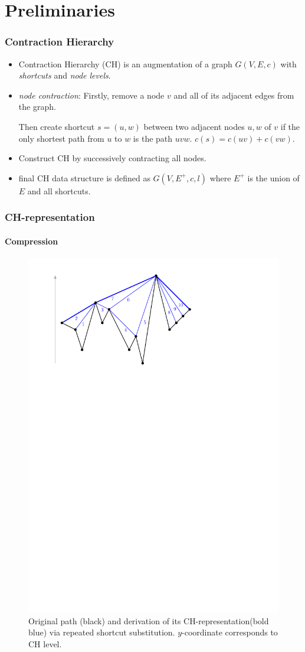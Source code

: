 \documentclass{beamer}
\newcommand{\chrep}{CH-representation\xspace}
\begin{document}
\section{Preliminaries}
\begin{frame}
	\frametitle{Contraction Hierarchy}
	\begin{itemize}
		\item Contraction Hierarchy (CH) is an augmentation of a graph $G(V,E,c)$ with \emph{shortcuts} and \emph{node levels}. \pause
		\item \emph{node contraction}: Firstly, remove a node $v$ and all of its adjacent edges from the graph. \pause

		      Then create shortcut $s = (u, w)$ between two adjacent nodes $u,w$ of $v$ if the only shortest path from $u$ to $w$ is the path $uvw$. $c(s) = c(uv) + c(vw)$. \pause
		\item Construct CH by successively contracting all nodes. \pause
		\item final CH data structure is defined as $G(V, E^+, c, l)$ where $E^+$ is the union of $E$ and all shortcuts.
	\end{itemize}
\end{frame}

\begin{frame}
	\frametitle{\chrep}
	\framesubtitle{Compression}
	\begin{figure}
		\includegraphics[width=.76\columnwidth]{images/toch}
		\caption{Original path (black) and derivation of its \chrep (bold blue) via repeated shortcut substitution. $y$-coordinate corresponds to CH level.}
	\end{figure}
\end{frame}
\end{document}
